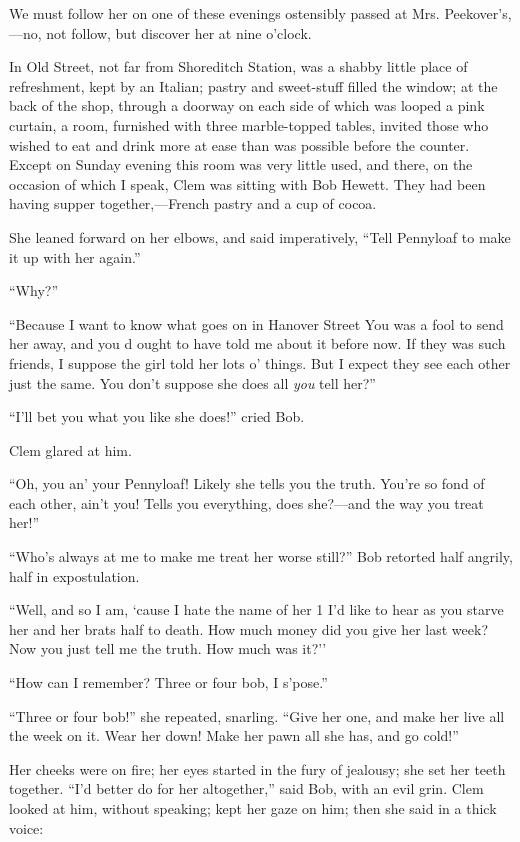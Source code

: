 We must follow her on one of these evenings ostensibly passed at Mrs.
Peekover's,---no, not follow, but discover her at nine o'clock.

In Old Street, not far from Shoreditch Station, was a shabby little
place of refreshment, kept by an Italian; pastry and sweet-stuff filled
the window; at the back of the shop, through a doorway on each side of
which was looped a pink curtain, a room, furnished with three
marble-topped tables, invited those who wished to eat and drink more at
ease than was possible before the counter. Except on Sunday evening this
room was very little used, and there, on the occasion of which I speak,
Clem was sitting with Bob Hewett. They had been having supper
together,---French pastry and a cup of cocoa.

She leaned forward on her elbows, and said
{\protect\hypertarget{31}{}{}}imperatively, ``Tell Pennyloaf to make it
up with her again.''

``Why?''

``Because I want to know what goes on in Hanover Street You was a fool
to send her away, and you d ought to have told me about it before now.
If they was such friends, I suppose the girl told her lots o' things.
But I expect they see each other just the same. You don't suppose she
does all \emph{you} tell her?''

``I'll bet you what you like she does!'' cried Bob.

Clem glared at him.

``Oh, you an' your Pennyloaf! Likely she tells you the truth. You're so
fond of each other, ain't you! Tells you everything, does she?---and the
way you treat her!''

``Who's always at me to make me treat her worse still?'' Bob retorted
half angrily, half in expostulation.

``Well, and so I am, `cause I hate the name of her 1 I'd like to hear as
you starve her and her brats half to death. How much money did you give
her last week? Now you just tell me the truth. How much was it?''

{\protect\hypertarget{32}{}{}}``How can I remember? Three or four bob, I
s'pose.''

``Three or four bob!'' she repeated, snarling. ``Give her one, and make
her live all the week on it. Wear her down! Make her pawn all she has,
and go cold!''

Her cheeks were on fire; her eyes started in the fury of jealousy; she
set her teeth together. ``I'd better do for her altogether,'' said Bob,
with an evil grin. Clem looked at him, without speaking; kept her gaze
on him; then she said in a thick voice:

